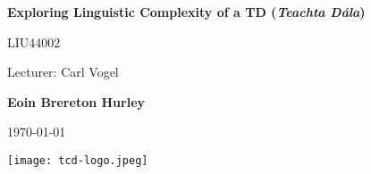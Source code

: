 \begin{titlepage}
    \begin{center}
        \vspace*{1cm}
            
        \Huge
        \textbf{Exploring Linguistic Complexity of a TD (\textit{Teachta Dála})}
            
        \vspace{0.5cm}
        \LARGE
        LIU44002
        
        \vspace{0cm}
        
        \large
        Lecturer: Carl Vogel
        \vspace{1.5cm}
            
        \textbf{Eoin Brereton Hurley}

        \vspace{0.2cm}
        
        \large \today

        \vspace{0.2cm}
        
        \large 
            
        \vspace{2.0cm}
            
        \texttt{[image: tcd-logo.jpeg]}

        \vfill
            
    \end{center}
\end{titlepage}